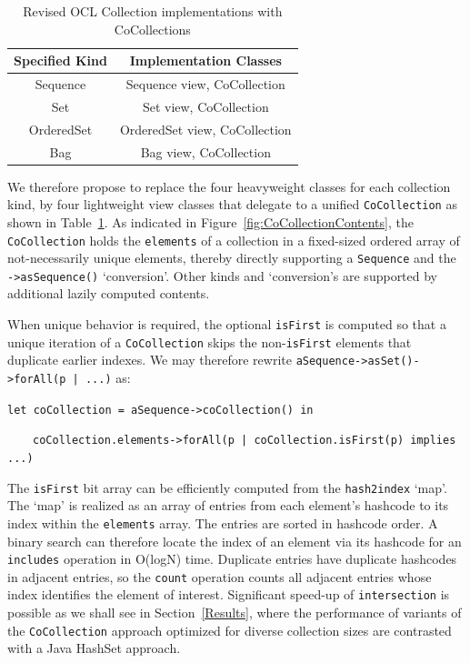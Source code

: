 \documentclass[
]{ceurart}
\begin{document}
\begin{table}[ht]
\begin{tabular}{ c | c }
Specified Kind & Implementation Classes \\
\hline
Sequence & Sequence view, CoCollection  \\
Set & Set view, CoCollection \\
OrderedSet & OrderedSet view, CoCollection \\
Bag & Bag view, CoCollection \\
\end{tabular}
\caption{Revised OCL Collection implementations with CoCollections}
\label{tab:RevisedOCLCollection}
\end{table}

We therefore propose to replace the four heavyweight classes for each collection kind, by four lightweight view classes that delegate to a unified \verb!CoCollection! as shown in Table~\ref{tab:RevisedOCLCollection}. As indicated in Figure~\ref{fig:CoCollectionContents}, the \verb!CoCollection! holds the \verb!elements! of a collection in a fixed-sized ordered array of not-necessarily unique elements, thereby directly supporting a \verb!Sequence! and the \verb!->asSequence()! `conversion'. Other kinds and `conversion's are supported by additional lazily computed contents.


When unique behavior is required, the optional \verb!isFirst! is computed so that a unique iteration of a \verb!CoCollection! skips the non-\verb!isFirst! elements that duplicate earlier indexes. We may therefore rewrite \verb!aSequence->asSet()->forAll(p | ...)! as:

\begin{description}[itemsep=-0.2cm]\vspace{-10pt}\small\begin{samepage}
\item \verb!let coCollection = aSequence->coCollection() in!
\item ~~~~\verb!coCollection.elements->forAll(p | coCollection.isFirst(p) implies ...)!
\end{samepage}\vspace{-10pt}\end{description}

The \verb!isFirst! bit array can be efficiently computed from the \verb!hash2index! `map'. The `map' is realized as an array of entries from each element's hashcode to its index within the \verb!elements! array. The entries are sorted in hashcode order. A binary search can therefore locate the index of an element via its hashcode for an  \verb!includes! operation in O(logN) time. Duplicate entries have duplicate hashcodes in adjacent entries, so the \verb!count! operation counts all adjacent entries whose index identifies the element of interest. Significant speed-up of \verb!intersection! is possible as we shall see in Section~\ref{Results}, where the performance of variants of the \verb!CoCollection! approach optimized for diverse collection sizes are contrasted with a Java HashSet approach.
\end{document}
